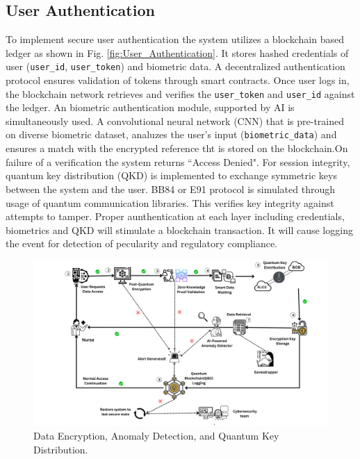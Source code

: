 \documentclass[pdflatex,sn-mathphys-num]{sn-jnl}
\theoremstyle{thmstyleone}%
\theoremstyle{thmstyletwo}%
\theoremstyle{thmstylethree}%
\begin{document}
\subsection{User Authentication}
To implement secure user authentication the system utilizes a blockchain based ledger as shown in Fig. \ref{fig:User_Authentication}. It stores hashed credentials of user (\texttt{user\_id}, \texttt{user\_token}) and biometric data\cite{bib14}. A decentralized authentication protocol ensures validation of tokens through smart contracts. Once user logs in, the blockchain network retrieves and verifies the \texttt{user\_token} and \texttt{user\_id} against the ledger. An biometric authentication module, supported by AI is simultaneously used. A convolutional neural network (CNN) that is pre-trained on diverse biometric dataset, analuzes the user’s input (\texttt{biometric\_data}) and ensures a match with the encrypted reference tht is stored on the blockchain.On failure of a verification the system returns ``Access Denied". For session integrity, quantum key distribution (QKD) is implemented to exchange symmetric keys between the system and the user\cite{}. BB84 or E91 protocol is simulated through usage of quantum communication libraries\cite{bib16}. This verifies key integrity against attempts to tamper. Proper aunthentication at each layer including credentials, biometrics and QKD will stimulate a blockchain transaction. It will cause logging the event for detection of pecularity and regulatory compliance.



\begin{figure}[t]
\centering
\includegraphics[width=13cm]{QKD.png}
\centering
\caption{Data Encryption, Anomaly Detection, and Quantum Key Distribution.}
  \label{fig:Data access}
\end{figure}
\end{document}
